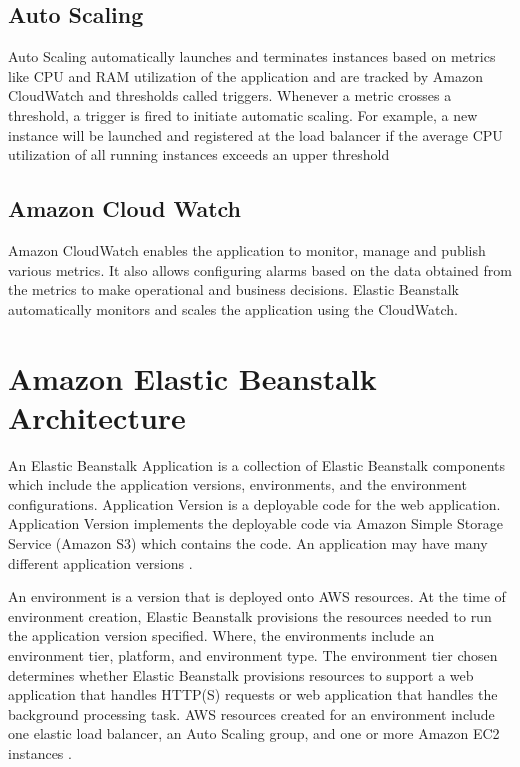 \documentclass[9pt,twocolumn,twoside]{../../styles/osajnl}
\begin{document}
\subsection{Auto Scaling}

Auto Scaling automatically launches and terminates instances based on
metrics like CPU and RAM utilization of the application and are
tracked by Amazon CloudWatch and thresholds called triggers. Whenever
a metric crosses a threshold, a trigger is fired to initiate automatic
scaling.  For example, a new instance will be launched and registered
at the load balancer if the average CPU utilization of all running
instances exceeds an upper threshold
    
\subsection{Amazon Cloud Watch}

Amazon CloudWatch enables the application to monitor, manage and
publish various metrics. It also allows configuring alarms based on
the data obtained from the metrics to make operational and business
decisions. Elastic Beanstalk automatically monitors and scales the
application using the CloudWatch.

\section{Amazon Elastic Beanstalk Architecture}

An Elastic Beanstalk Application is a collection of Elastic Beanstalk
components which include the application versions, environments, and
the environment configurations. Application Version is a deployable
code for the web application. Application Version implements the
deployable code via Amazon Simple Storage Service (Amazon S3) which
contains the code. An application may have many different application
versions \cite{elastic-component}.


An environment is a version that is deployed onto AWS resources.  At
the time of environment creation, Elastic Beanstalk provisions the
resources needed to run the application version specified. Where, the
environments include an environment tier, platform, and environment
type. The environment tier chosen determines whether Elastic Beanstalk
provisions resources to support a web application that handles HTTP(S)
requests or web application that handles the background processing
task. AWS resources created for an environment include one elastic
load balancer, an Auto Scaling group, and one or more Amazon EC2
instances \cite{elastic-architecture}.
\end{document}
